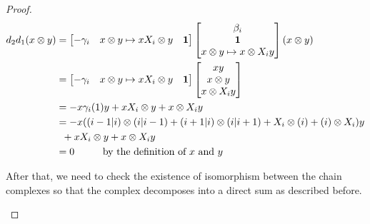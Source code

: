 \documentclass[psamsfonts,a4paper]{amsart}
\theoremstyle{plain}
\numberwithin{equation}{section}
\numberwithin{figure}{section}
\renewcommand{\b}{\beta}
\newcommand{\tb}{\textbf}
\newcommand{\ot}{\otimes}
\newcommand{\op}{\oplus}
\newcommand{\<}{\langle}
\renewcommand{\>}{\rangle}
\theoremstyle{named}
\theoremstyle{name}
\begin{document}
\begin{proof}
\begin{align*}
d_2 d_1(x \ot y)
 &= \begin{bmatrix}
-\gamma_i & x \ot y \mapsto xX_i \ot y & \tb{1}
\end{bmatrix} 
\begin{bmatrix}
\b_i \\ \textbf{1} \\ x \ot y \mapsto x \ot X_i y
\end{bmatrix}
(x \ot y)  \\
&= \begin{bmatrix}
-\gamma_i & x \ot y \mapsto xX_i \ot y & \tb{1}\end{bmatrix} 
\begin{bmatrix}
xy \\   x \ot y \\  x \ot X_iy
\end{bmatrix} \\
&= -x\gamma_i(1)y + xX_i \ot y + x \ot X_iy \\
&= -x((i-1|i)\ot(i|i-1) + (i+1|i)\ot(i|i+1) + X_i\ot(i) + (i)\ot X_i)y \\
& \hspace{2mm}  + xX_i \ot y + x \ot X_iy\\
& = 0 \hspace{10mm} \text{by the definition of $x$ and $y$}
\end{align*}

After that, we need to check the existence of isomorphism between the chain complexes so that the complex decomposes into a direct sum as described before.

\begin{center}


\end{center}



\end{proof}
\end{document}
